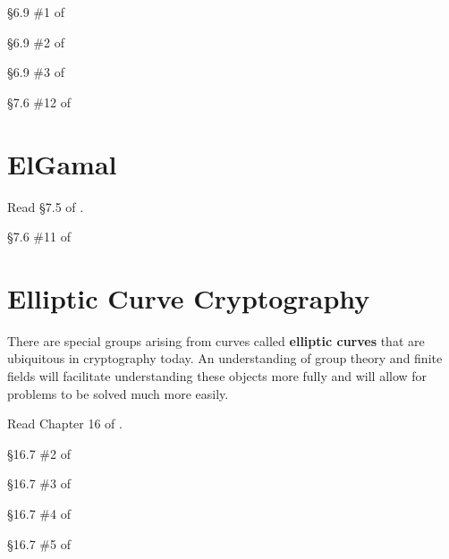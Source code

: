 \begin{problem}[5 points]
	\S 6.9 \#1 of \cite {tw}
\end{problem}

\begin{problem}[10 points]
	\S 6.9 \#2 of \cite {tw}
\end{problem}

\begin{problem}[10 points]
	\S 6.9 \#3 of \cite {tw}
\end{problem}

\begin{problem}[20 points]
	\S 7.6 \#12 of \cite {tw}
\end{problem}

	\section{ElGamal}

	Read \S 7.5 of \cite{tw}.

\begin{problem}[10 points]
	\S 7.6 \#11 of \cite {tw}
\end{problem}

	\section{Elliptic Curve Cryptography}

	There are special groups arising from curves called {\bf elliptic curves} that are ubiquitous in cryptography today. An understanding of group theory and finite fields will facilitate understanding these objects more fully and will allow for problems to be solved much more easily.

	Read Chapter 16 of \cite{tw}.

\begin{problem}[15 points]
	\S 16.7 \#2 of \cite {tw}
\end{problem}

\begin{problem}[10 points]
	\S 16.7 \#3 of \cite {tw}
\end{problem}

\begin{problem}[10 points]
	\S 16.7 \#4 of \cite {tw}
\end{problem}

\begin{problem}[10 points]
	\S 16.7 \#5 of \cite {tw}
\end{problem}

